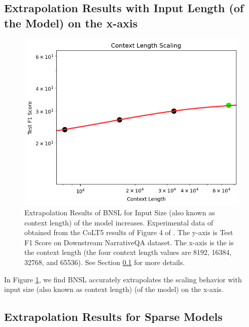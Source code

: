 \documentclass{article} %
\begin{document}
\subsection{Extrapolation Results with Input Length (of the Model) on the x-axis}
\label{section:length}

\vspace{-3.5mm}

\begin{figure}[htbp]
    \centering
\includegraphics[width=1.0\textwidth]{figures/input_length/length.png}

\vspace{-3.5mm}
    \caption{
Extrapolation Results of BNSL for Input Size (also known as context length) of the model increases. Experimental data of obtained from the CoLT5 results of Figure 4 of \cite{ainslie2023colt5}. The y-axis is Test F1 Score on Downstream NarrativeQA \citep{kovcisky2018narrativeqa} dataset. The x-axis is the is the context length (the four context length values are 8192, 16384, 32768, and 65536).
See Section \ref{section:length} for more details.
    }
    \label{fig:length}
\end{figure}

In Figure \ref{fig:length}, we find BNSL accurately extrapolates the scaling behavior with input size (also known as context length) (of the model) on the x-axis.


\clearpage

\subsection{Extrapolation Results for Sparse Models}
\label{section:sparse}
\end{document}
